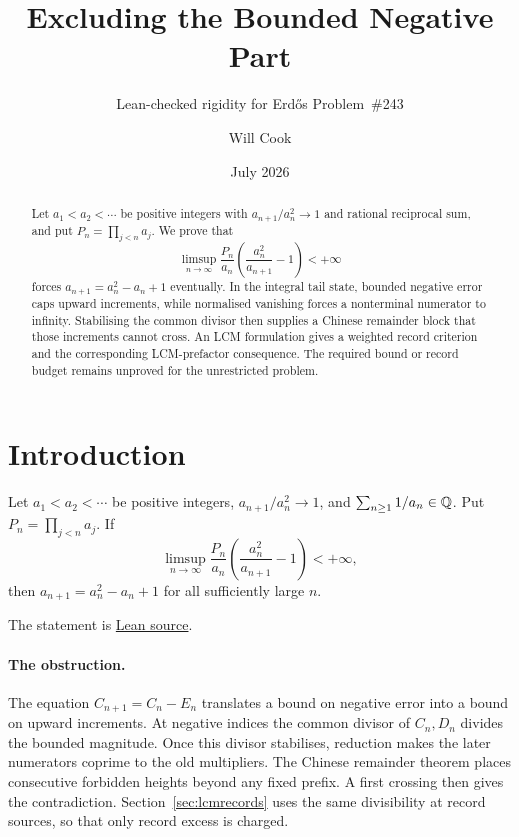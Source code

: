 \documentclass[11pt]{article}
\title{Excluding the Bounded Negative Part}
\subtitle{Lean-checked rigidity for Erd\H{o}s Problem~\#243}
\author{Will Cook}
\date{July 2026}
\begin{document}
\maketitle
\noteprovenance

\begin{abstract}
Let $a_1<a_2<\cdots$ be positive integers with $a_{n+1}/a_n^2\to1$
and rational reciprocal sum, and put $P_n=\prod_{j<n}a_j$. We prove that
\[
 \limsup_{n\to\infty}\frac{P_n}{a_n}
 \left(\frac{a_n^2}{a_{n+1}}-1\right)<+\infty
\]
forces $a_{n+1}=a_n^2-a_n+1$ eventually. In the integral tail state,
bounded negative error caps upward increments, while normalised vanishing
forces a nonterminal numerator to infinity. Stabilising the common divisor
then supplies a Chinese remainder block that those increments cannot cross.
An LCM formulation gives a weighted record criterion and the corresponding
LCM-prefactor consequence. The required bound or record budget remains
unproved for the unrestricted problem.
\end{abstract}

\section{Introduction}\label{sec:problem}

\begin{corollary}\label{res:originalbounded}
Let $a_1<a_2<\cdots$ be positive integers, $a_{n+1}/a_n^2\to1$, and
$\sum_{n\ge1}1/a_n\in\mathbb{Q}$.  Put $P_n=\prod_{j<n}a_j$.  If
\[
 \limsup_{n\to\infty}\frac{P_n}{a_n}
 \left(\frac{a_n^2}{a_{n+1}}-1\right)<+\infty,
\]
then $a_{n+1}=a_n^2-a_n+1$ for all sufficiently large $n$.
\end{corollary}

\noindent The statement is
\href{https://github.com/wcook04/plectis-erdos/blob/f36a98bf3d3e6f65f1074e3b800e3293d5b8a51a/ErdosProblems/Erdos243/PaperCompleteR7/ProductDefect.lean#L211}{Lean source}.

\paragraph{The obstruction.}
The equation $C_{n+1}=C_n-E_n$ translates a bound on negative error into a
bound on upward increments. At negative indices the common divisor of
$C_n,D_n$ divides the bounded magnitude. Once this divisor stabilises,
reduction makes the later numerators coprime to the old multipliers.
The Chinese remainder theorem places consecutive forbidden heights beyond
any fixed prefix. A first crossing then gives the contradiction.
Section~\ref{sec:lcmrecords} uses the same divisibility at record sources,
so that only record excess is charged.
\end{document}
